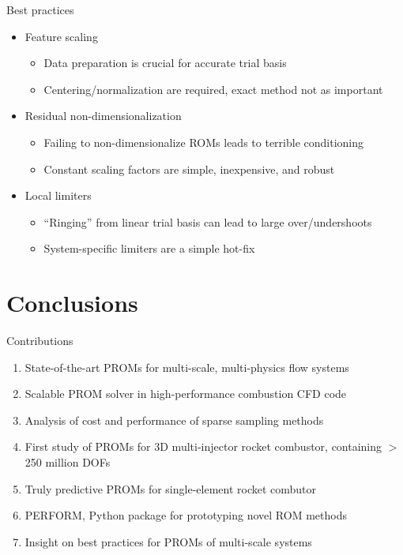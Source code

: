 \documentclass[]{beamer}
\begin{document}
\begin{frame}{Best practices}
	\begin{itemize}
		\item Feature scaling
		\begin{itemize}
			\item Data preparation is crucial for accurate trial basis
			\item Centering/normalization are required, exact method not as important
		\end{itemize}
		\item Residual non-dimensionalization
		\begin{itemize}
			\item Failing to non-dimensionalize ROMs leads to terrible conditioning
			\item Constant scaling factors are simple, inexpensive, and robust
		\end{itemize}
		\item Local limiters
		\begin{itemize}
			\item ``Ringing'' from linear trial basis can lead to large over/undershoots
			\item System-specific limiters are a simple hot-fix
		\end{itemize}
		
	\end{itemize}
\end{frame}

\section*{Conclusions}

\begin{frame}{Contributions}
    \begin{enumerate}
        \item State-of-the-art PROMs for multi-scale, multi-physics flow systems
        \item Scalable PROM solver in high-performance combustion CFD code
        \item Analysis of cost and performance of sparse sampling methods
        \item First study of PROMs for 3D multi-injector rocket combustor, containing $>$ 250 million DOFs
        \item Truly predictive PROMs for single-element rocket combutor
        \item PERFORM, Python package for prototyping novel ROM methods
        \item Insight on best practices for PROMs of multi-scale systems
    \end{enumerate}
\end{frame}
\end{document}
